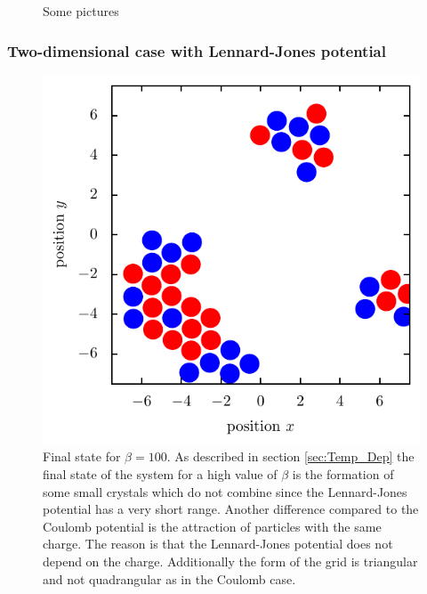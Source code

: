 \documentclass[11pt, a4paper]{article}
\numberwithin{equation}{section}
\begin{document}
\begin{figure}[p]
\begin{subfigure}{0.49\textwidth}
	\end{subfigure}
	\caption{Some pictures}	
\end{figure}




\subsubsection{Two-dimensional case with Lennard-Jones potential}

\begin{figure}[!h]
\centering
\includegraphics[scale=1]{figures/Beta_100_LJ.pdf}
\caption{Final state for $\beta = 100$.
As described in section \ref{sec:Temp_Dep} the final state of the system for a high value of $\beta$ is the formation of some small crystals which do not combine since the Lennard-Jones potential has a very short range.
Another difference compared to the Coulomb potential is the attraction of particles with the same charge.
The reason is that the Lennard-Jones potential does not depend on the charge.
Additionally the form of the grid is triangular and not quadrangular as in the Coulomb case.
}
\end{figure}
\end{document}
